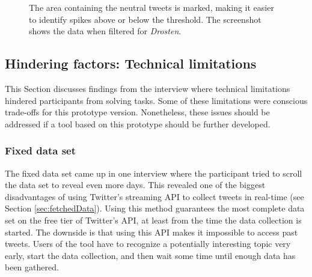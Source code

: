 \begin{figure}[h!tb]
    \centering
    \caption{The area containing the neutral tweets is marked, making it easier to identify spikes above or below the threshold. The screenshot shows the data when filtered for \emph{Drosten}.}
    \label{fig:sentiment_neutral_area}
\end{figure}

\subsection{Hindering factors: Technical limitations}
This Section discusses findings from the interview where technical limitations hindered participants from solving tasks. Some of these limitations were conscious trade-offs for this prototype version. Nonetheless, these issues should be addressed if a tool based on this prototype should be further developed.

\subsubsection*{Fixed data set} \label{sec:fixedDataSet}
The fixed data set came up in one interview where the participant tried to scroll the data set to reveal even more days. This revealed one of the biggest disadvantages of using Twitter's streaming API to collect tweets in real-time (see Section \ref{sec:fetchedData}). Using this method guarantees the most complete data set on the free tier of Twitter's API, at least from the time the data collection is started. The downside is that using this API makes it impossible to access past tweets. Users of the tool have to recognize a potentially interesting topic very early, start the data collection, and then wait some time until enough data has been gathered.

